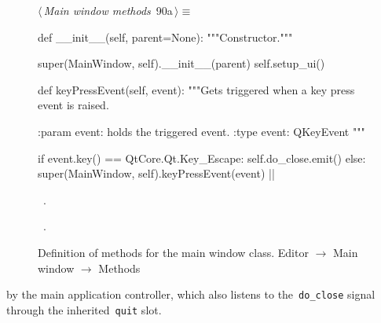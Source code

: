 \documentclass[%
    a4paper,    %
    justified,  %
    nobib,      %
    openany     %
]{tufte-book}
\makeatletter
\renewcommand{\label}[1]{\@tufte@label{##1}}%
\makeatother
\begin{document}
\begin{figure}[!htpb]
\begin{flushleft} \small
\begin{minipage}{\linewidth}\label{scrap17}\raggedright\small
{} $\langle\,${\itshape Main window methods}\nobreak\ {\footnotesize {90a}}$\,\rangle\equiv$
\vspace{-1ex}
\begin{pythoncode}
def __init__(self, parent=None):
    """Constructor."""

    super(MainWindow, self).__init__(parent)
    self.setup_ui()

def keyPressEvent(self, event):
    """Gets triggered when a key press event is raised.

    :param event: holds the triggered event.
    :type  event: QKeyEvent
    """

    if event.key() == QtCore.Qt.Key_Escape:
        self.do_close.emit()
    else:
        super(MainWindow, self).keyPressEvent(event)
|\NWsep|
\end{pythoncode}
\vspace{1.5ex}
\footnotesize
\begin{list}{}{\setlength{\itemsep}{-\parsep}\setlength{\itemindent}{-\leftmargin}}
\item \NWtxtMacroDefBy\ .
\item \NWtxtMacroRefIn\ .

\item{}
\end{list}
\end{minipage}\vspace{4ex}
\end{flushleft}
\caption{Definition of methods for the main window class.
  \newline{}\newline{}Editor $\rightarrow$ Main window $\rightarrow$ Methods}
\end{figure}


 by the main application
controller, which also listens to the~\verb=do_close= signal through the
inherited~\verb=quit= slot.
\end{document}
